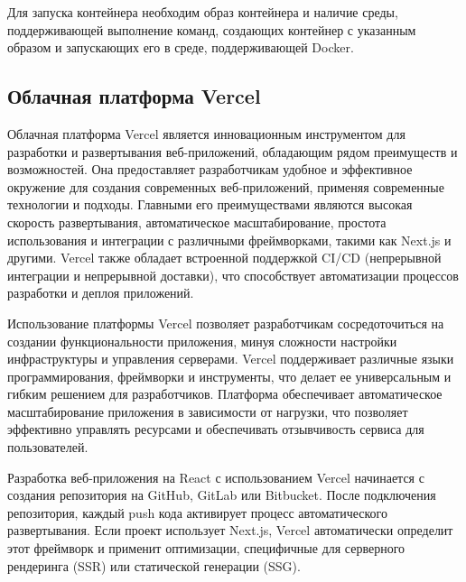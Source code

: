 \documentclass[master, och, diploma]{SCWorks}
\begin{document}
Для запуска контейнера необходим образ контейнера и наличие среды, поддерживающей выполнение команд, создающих контейнер с указанным образом и запускающих его в среде, поддерживающей Docker\cite{docker_documentation}\cite{docker_introduction}.



\subsection{Облачная платформа Vercel}
Облачная платформа Vercel является инновационным инструментом для разработки и развертывания веб-приложений, обладающим рядом преимуществ и возможностей. Она предоставляет разработчикам удобное и эффективное окружение для создания современных веб-приложений, применяя современные технологии и подходы. Главными его преимуществами являются высокая скорость развертывания, автоматическое масштабирование, простота использования и интеграции с различными фреймворками, такими как Next.js и другими. Vercel также обладает встроенной поддержкой CI/CD (непрерывной интеграции и непрерывной доставки), что способствует автоматизации процессов разработки и деплоя приложений\cite{vercel_official}.

Использование платформы Vercel позволяет разработчикам сосредоточиться на создании функциональности приложения, минуя сложности настройки инфраструктуры и управления серверами. Vercel поддерживает различные языки программирования, фреймворки и инструменты, что делает ее универсальным и гибким решением для разработчиков. Платформа обеспечивает автоматическое масштабирование приложения в зависимости от нагрузки, что позволяет эффективно управлять ресурсами и обеспечивать отзывчивость сервиса для пользователей\cite{vercel_official}\cite{Litvincev_2023}.

Разработка веб-приложения на React с использованием Vercel начинается с создания репозитория на GitHub, GitLab или Bitbucket. После подключения репозитория, каждый push кода активирует процесс автоматического развертывания. Если проект использует Next.js, Vercel автоматически определит этот фреймворк и применит оптимизации, специфичные для серверного рендеринга (SSR) или статической генерации (SSG). 
\end{document}
